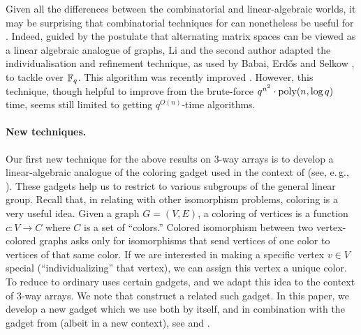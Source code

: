 Given all the differences between the combinatorial and linear-algebraic 
worlds, it may be surprising that combinatorial techniques for \GIlong can nonetheless be useful for \GpIlong. Indeed, guided by the 
postulate that alternating matrix spaces can be viewed as a linear algebraic 
analogue of graphs, Li and the second author \cite{LQ17} adapted the individualisation and 
refinement technique, as used by Babai, Erd\H{o}s and Selkow \cite{BES80}, to 
tackle \AltMatSpIsomlong over $\mathbb{F}_q$. This algorithm was recently 
improved \cite{BGL+19}. However, this technique, though helpful to improve from 
the brute-force
$q^{n^2}\cdot \mathrm{poly}(n, \log q)$ time, seems still limited to getting $q^{O(n)}$-time algorithms.


\paragraph{New techniques.} 
Our first new 
technique for the above results on 3-way arrays is to develop a linear-algebraic analogue 
of the coloring gadget used in the 
context of \GIlong (see, e.\,g., \cite{KST93}). 
These gadgets
help us to restrict to various subgroups of the general linear group. 
Recall that, in relating \GI with other isomorphism problems, coloring is a very 
useful idea. Given a graph $G=(V, E)$, a coloring of vertices is 
 a function $c:V \to C$ where $C$ is a set of ``colors.'' Colored isomorphism between two 
vertex-colored graphs asks only for isomorphisms that send vertices of one color 
to vertices of that same color.
If we are interested in 
making a specific vertex $v\in V$ special (``individualizing'' that vertex), we can assign this 
vertex a unique color. To reduce  to 
ordinary \GIlong uses certain gadgets, and we adapt this idea to the context of 
3-way arrays.  We note that 
\cite{FGS19} construct a related such gadget. In this paper, we develop a new gadget which we use both by itself, and in combination with the gadget from \cite{FGS19} (albeit in a new context), 
see  and .

